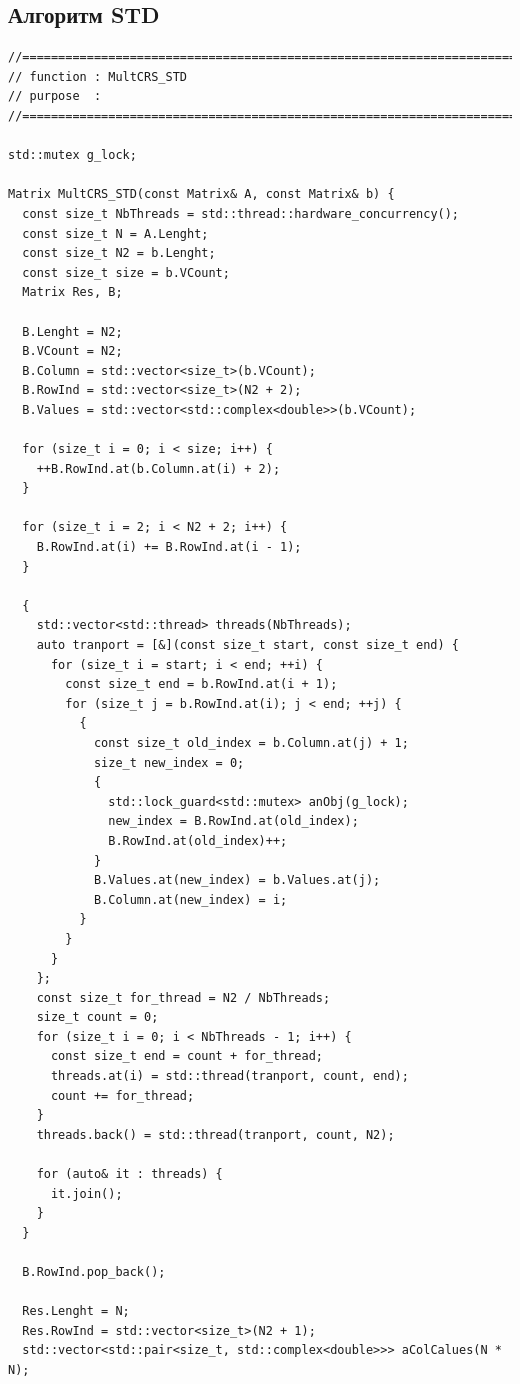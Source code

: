 \documentclass{report}
\begin{document}
\subsection*{Алгоритм STD}
\begin{lstlisting}
//=======================================================================
// function : MultCRS_STD
// purpose  :
//=======================================================================

std::mutex g_lock;

Matrix MultCRS_STD(const Matrix& A, const Matrix& b) {
  const size_t NbThreads = std::thread::hardware_concurrency();
  const size_t N = A.Lenght;
  const size_t N2 = b.Lenght;
  const size_t size = b.VCount;
  Matrix Res, B;

  B.Lenght = N2;
  B.VCount = N2;
  B.Column = std::vector<size_t>(b.VCount);
  B.RowInd = std::vector<size_t>(N2 + 2);
  B.Values = std::vector<std::complex<double>>(b.VCount);

  for (size_t i = 0; i < size; i++) {
    ++B.RowInd.at(b.Column.at(i) + 2);
  }

  for (size_t i = 2; i < N2 + 2; i++) {
    B.RowInd.at(i) += B.RowInd.at(i - 1);
  }

  {
    std::vector<std::thread> threads(NbThreads);
    auto tranport = [&](const size_t start, const size_t end) {
      for (size_t i = start; i < end; ++i) {
        const size_t end = b.RowInd.at(i + 1);
        for (size_t j = b.RowInd.at(i); j < end; ++j) {
          {
            const size_t old_index = b.Column.at(j) + 1;
            size_t new_index = 0;
            {
              std::lock_guard<std::mutex> anObj(g_lock);
              new_index = B.RowInd.at(old_index);
              B.RowInd.at(old_index)++;
            }
            B.Values.at(new_index) = b.Values.at(j);
            B.Column.at(new_index) = i;
          }
        }
      }
    };
    const size_t for_thread = N2 / NbThreads;
    size_t count = 0;
    for (size_t i = 0; i < NbThreads - 1; i++) {
      const size_t end = count + for_thread;
      threads.at(i) = std::thread(tranport, count, end);
      count += for_thread;
    }
    threads.back() = std::thread(tranport, count, N2);

    for (auto& it : threads) {
      it.join();
    }
  }

  B.RowInd.pop_back();

  Res.Lenght = N;
  Res.RowInd = std::vector<size_t>(N2 + 1);
  std::vector<std::pair<size_t, std::complex<double>>> aColCalues(N * N);


\end{lstlisting}
\end{document}
